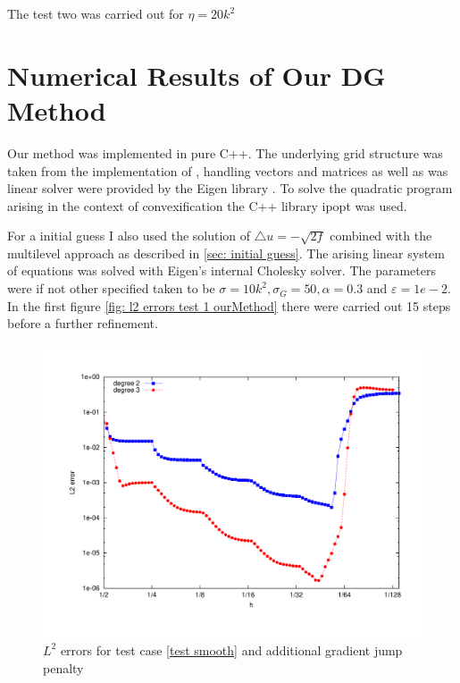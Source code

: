 The test two was carried out for $\eta=20k^2$


\newpage

\section{Numerical Results of Our DG Method}

Our method was implemented in pure C++. The underlying grid structure was taken from the implementation of \cite{BMV2009}, handling vectors and matrices as well as was linear solver were provided by the Eigen library \cite{eigenweb}. To solve the quadratic program arising in the context of convexification the C++ library ipopt \cite{ipopt} was used.

For a initial guess I also used the solution of $\triangle u = -\sqrt{2f}$ combined with the multilevel approach as described in \ref{sec: initial guess}.
The arising linear system of equations was solved with Eigen's internal Cholesky solver.
The parameters were if not other specified taken to be $\sigma=10 k^2, \sigma_G = 50, \alpha =
0.3$ and $\varepsilon = 1e-2$.
In the first figure \ref{fig: l2 errors test 1 ourMethod} there were carried out 15 steps before a further refinement.

\begin{figure}[h!]
	\includegraphics[scale =0.5]{plots/MA1.pdf}
	\caption{$L^2$ errors for test case \ref{test smooth} and additional gradient jump penalty}
	\label{fig: l2 errors test smooth ourMethod}
\end{figure}

